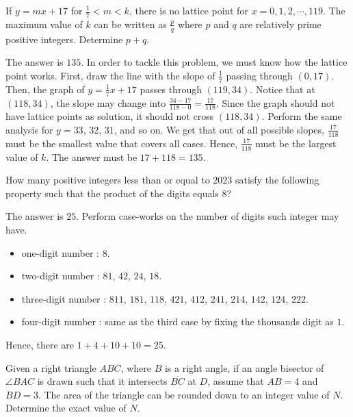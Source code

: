 \begin{problem}
If $y=mx+17$ for $\frac{1}{7}<m<k$, there is no lattice point for $x=0, 1, 2, \cdots, 119$. The maximum value of $k$ can be written as $\frac{p}{q}$ where $p$ and $q$ are relatively prime positive integers. Determine $p+q$. 
\end{problem}

\begin{solution}
The answer is $135$. In order to tackle this problem, we must know how the lattice point works. First, draw the line with the slope of $\frac{1}{7}$ passing through $(0,17)$. Then, the graph of $y=\frac{1}{7}x+17$ passes through $(119,34)$. Notice that at $(118,34)$, the slope may change into $\frac{34-17}{118-0}=\frac{17}{118}$. Since the graph should not have lattice points as solution, it should not cross $(118,34)$. Perform the same analysis for $y=33$, $32$, $31$, and so on. We get that out of all possible slopes, $\frac{17}{118}$ must be the smallest value that covers all cases. Hence, $\frac{17}{118}$ must be the largest value of $k$. The answer must be $17+118=135$.
\end{solution}

\begin{problem}
How many positive integers less than or equal to $2023$ satisfy the following property such that the product of the digits equals $8$?
\end{problem}

\begin{solution}
The answer is $25$. Perform case-works on the number of digits such integer may have.
\begin{itemize}
    \item one-digit number : $8$.
    \item two-digit number : $81$, $42$, $24$, $18$.
    \item three-digit number : $811$, $181$, $118$, $421$, $412$, $241$, $214$, $142$, $124$, $222$.
    \item four-digit number : same as the third case by fixing the thousands digit as $1$.
\end{itemize}
Hence, there are $1+4+10+10=25$.
\end{solution}

\begin{problem}
Given a right triangle $ABC$, where $B$ is a right angle, if an angle bisector of $\angle BAC$ is drawn such that it intersects $\overline{BC}$ at $D$, assume that $AB=4$ and $BD=3$. The area of the triangle can be rounded down to an integer value of $N$. Determine the exact value of $N$.
\end{problem}

